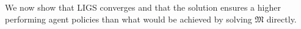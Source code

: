 \documentclass{article}
\begin{document}
We now show that LIGS converges and that the solution ensures a higher performing agent policies than what would be achieved by solving $\mathfrak{M}$ directly.
% 
% 
% 
% 
% 
% 
\end{document}
